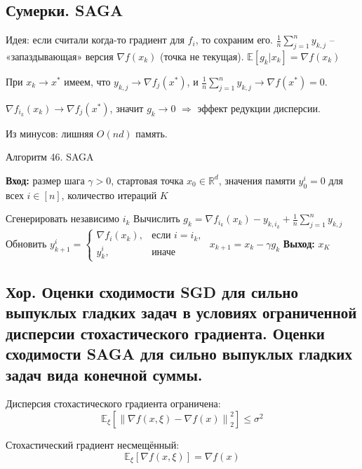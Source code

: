 \subsection*{Сумерки. SAGA}

Идея: если считали когда-то градиент для $f_i$, то сохраним его.
$\frac{1}{n} \sum_{j=1}^n y_{k,j}$ – «запаздывающая» версия $\nabla f(x_k)$ (точка не текущая).
$\mathbb{E}[g_k | x_k] = \nabla f(x_k)$

При $x_k \to x^*$ имеем, что $y_{k,j} \to \nabla f_j(x^*)$, и $\frac{1}{n} \sum_{j=1}^n y_{k,j} \to \nabla f(x^*) = 0$.

$\nabla f_{i_k}(x_k) \to \nabla f_j(x^*)$, значит $g_k \to 0$ $\Rightarrow$ эффект редукции дисперсии.

Из минусов: лишняя $O(nd)$ память.

\begin{algorithm}[H]
    \caption{Алгоритм 46. SAGA}
    \textbf{Вход:} размер шага $\gamma > 0$, стартовая точка $x_0 \in \mathbb{R}^d$, значения памяти $y_0^i = 0$ для всех $i \in [n]$, количество итераций $K$
    \begin{algorithmic}[1]
        \State Сгенерировать независимо $i_k$
        \State Вычислить $g_k = \nabla f_{i_k}(x_k) - y_{k, i_k} + \frac{1}{n} \sum_{j=1}^n y_{k, j}$
        \State Обновить $y_{k+1}^i = \left\{
            \begin{array}{ll}
                \nabla f_i(x_k), & \text{если } i = i_k, \\
                y_{k}^i,         & \text{иначе}
            \end{array}
            \right.$
        \State $x_{k+1} = x_k - \gamma g_k$
        \EndFor
        \State \textbf{Выход:} $x_K$
    \end{algorithmic}
\end{algorithm}

\subsection{Хор. Оценки сходимости SGD для сильно выпуклых гладких задач в условиях ограниченной дисперсии
    стохастического градиента. Оценки сходимости SAGA для сильно выпуклых гладких задач вида конечной суммы.}

Дисперсия стохастического градиента ограничена:
$$\mathbb{E}_{\xi} \left[ \left\| \nabla f(x, \xi) - \nabla f(x) \right\|_2^2 \right] \leq \sigma^2$$

Стохастический градиент несмещённый:
$$\mathbb{E}_{\xi}[\nabla f(x, \xi)] = \nabla f(x)$$

